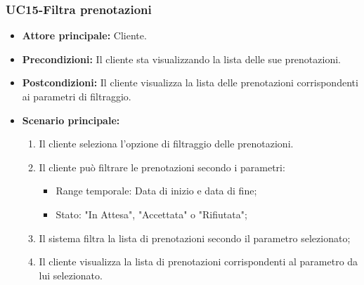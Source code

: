 \subsubsection{UC15-Filtra prenotazioni}
\begin{itemize}
\item \textbf{Attore principale:} Cliente.
\item \textbf{Precondizioni:} Il cliente sta visualizzando la lista delle sue prenotazioni.
\item \textbf{Postcondizioni:} Il cliente visualizza la lista delle prenotazioni corrispondenti ai parametri di filtraggio.
\item \textbf{Scenario principale:}
\begin{enumerate}
    \item Il cliente seleziona l'opzione di filtraggio delle prenotazioni.
    \item Il cliente può filtrare le prenotazioni secondo i parametri:
              \begin{itemize}
                \item Range temporale: Data di inizio e data di fine;
                \item Stato: "In Attesa", "Accettata" o "Rifiutata";
              \end{itemize}
    \item Il sistema filtra la lista di prenotazioni secondo il parametro selezionato;
    \item Il cliente visualizza la lista di prenotazioni corrispondenti al parametro da lui selezionato. 
\end{enumerate}
\end{itemize}

